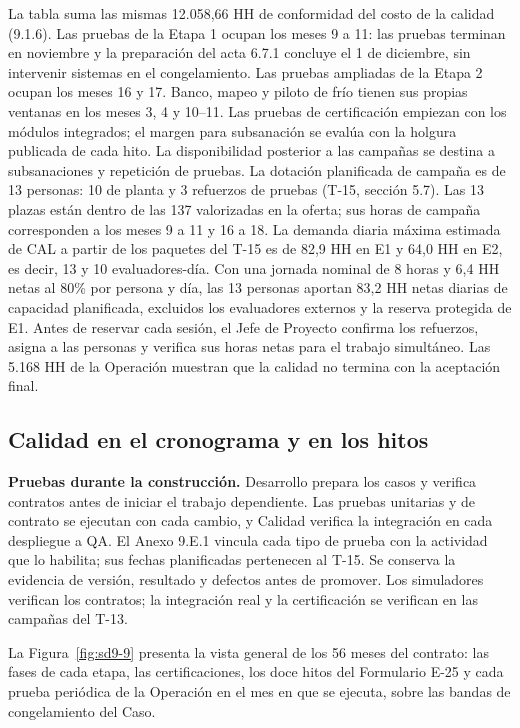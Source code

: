 La tabla suma las mismas 12.058,66 HH de conformidad del costo de la calidad (9.1.6). Las pruebas de la Etapa 1 ocupan los meses 9 a 11: las pruebas terminan en noviembre y la preparación del acta 6.7.1 concluye el 1 de diciembre, sin intervenir sistemas en el congelamiento. Las pruebas ampliadas de la Etapa 2 ocupan los meses 16 y 17. Banco, mapeo y piloto de frío tienen sus propias ventanas en los meses 3, 4 y 10–11. Las pruebas de certificación empiezan con los módulos integrados; el margen para subsanación se evalúa con la holgura publicada de cada hito. La disponibilidad posterior a las campañas se destina a subsanaciones y repetición de pruebas. La dotación planificada de campaña es de 13 personas: 10 de planta y 3 refuerzos de pruebas (T-15, sección 5.7). Las 13 plazas están dentro de las 137 valorizadas en la oferta; sus horas de campaña corresponden a los meses 9 a 11 y 16 a 18. La demanda diaria máxima estimada de CAL a partir de los paquetes del T-15 es de 82,9 HH en E1 y 64,0 HH en E2, es decir, 13 y 10 evaluadores-día. Con una jornada nominal de 8 horas y 6,4 HH netas al 80\% por persona y día, las 13 personas aportan 83,2 HH netas diarias de capacidad planificada, excluidos los evaluadores externos y la reserva protegida de E1. Antes de reservar cada sesión, el Jefe de Proyecto confirma los refuerzos, asigna a las personas y verifica sus horas netas para el trabajo simultáneo. Las 5.168 HH de la Operación muestran que la calidad no termina con la aceptación final.

\subsection{Calidad en el cronograma y en los hitos}

\textbf{Pruebas durante la construcción.} Desarrollo prepara los casos y verifica contratos antes de iniciar el trabajo dependiente. Las pruebas unitarias y de contrato se ejecutan con cada cambio, y Calidad verifica la integración en cada despliegue a QA. El Anexo 9.E.1 vincula cada tipo de prueba con la actividad que lo habilita; sus fechas planificadas pertenecen al T-15. Se conserva la evidencia de versión, resultado y defectos antes de promover. Los simuladores verifican los contratos; la integración real y la certificación se verifican en las campañas del T-13.

La Figura~\ref{fig:sd9-9} presenta la vista general de los 56 meses del contrato: las fases de cada etapa, las certificaciones, los doce hitos del Formulario E-25 y cada prueba periódica de la Operación en el mes en que se ejecuta, sobre las bandas de congelamiento del Caso.

